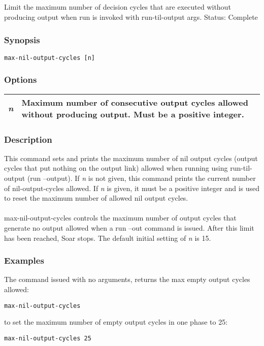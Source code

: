 \subsection{}
\label{max-nil-output-cycles}
Limit the maximum number of decision cycles that are executed without producing output when run is invoked with run-til-output args. 
 Status: Complete
\subsubsection*{Synopsis}
\begin{verbatim}
max-nil-output-cycles [n]
\end{verbatim}
\subsubsection*{Options}
\begin{tabular}{|l|l|}
\hline 
\emph{n}
 & Maximum number of consecutive output cycles allowed without producing output. Must be a positive integer.  \\
 \hline 
\end{tabular}
\subsubsection*{Description}
 This command sets and prints the maximum number of nil output cycles (output cycles that put nothing on the output link) allowed when running using run-til-output (run --output). If \emph{n}
 is not given, this command prints the current number of nil-output-cycles allowed. If \emph{n}
 is given, it must be a positive integer and is used to reset the maximum number of allowed nil output cycles. \\ 
\\ 
max-nil-output-cycles controls the maximum number of output cycles that generate no output allowed when a run --out command is issued. After this limit has been reached, Soar stops. The default initial setting of \emph{n}
 is 15. 
\subsubsection*{Examples}
 The command issued with no arguments, returns the max empty output cycles allowed: \begin{verbatim}
max-nil-output-cycles 
\end{verbatim}
 to set the maximum number of empty output cycles in one phase to 25: \begin{verbatim}
max-nil-output-cycles 25 
\end{verbatim}
